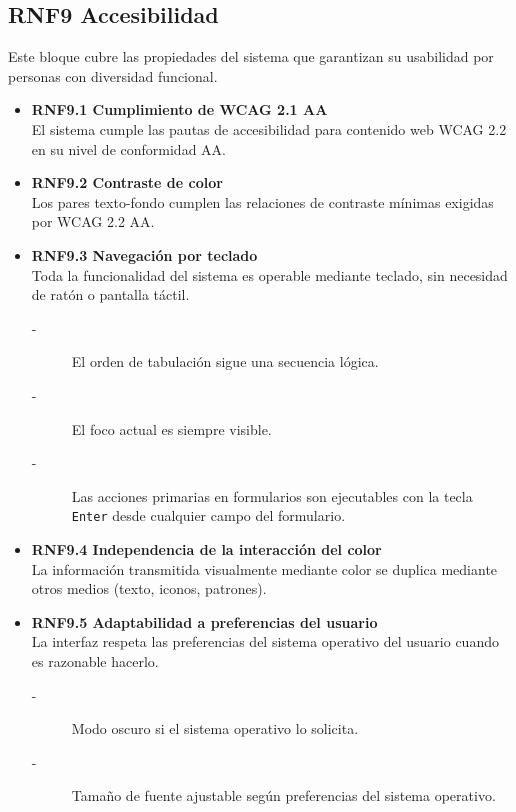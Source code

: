 \subsection{RNF9 Accesibilidad}
Este bloque cubre las propiedades del sistema que garantizan su
usabilidad por personas con diversidad funcional.
\begin{itemize}
    \item \textbf{RNF9.1 Cumplimiento de WCAG 2.1 AA} \\
    El sistema cumple las pautas de accesibilidad para contenido web
    WCAG 2.2 en su nivel de conformidad AA.\@


    \item \textbf{RNF9.2 Contraste de color} \\
    Los pares texto-fondo cumplen las relaciones de contraste mínimas
    exigidas por WCAG 2.2 AA.\@


    \item \textbf{RNF9.3 Navegación por teclado} \\
    Toda la funcionalidad del sistema es operable mediante teclado, sin
    necesidad de ratón o pantalla táctil.
    \begin{description}
        \item[-] El orden de tabulación sigue una secuencia lógica.
        \item[-] El foco actual es siempre visible.
        \item[-] Las acciones primarias en formularios son ejecutables con la tecla
        \texttt{Enter} desde cualquier campo del formulario.
    \end{description}


    \item \textbf{RNF9.4 Independencia de la interacción del color} \\
    La información transmitida visualmente mediante color se duplica
    mediante otros medios (texto, iconos, patrones).


    \item \textbf{RNF9.5 Adaptabilidad a preferencias del usuario} \\
    La interfaz respeta las preferencias del sistema operativo del
    usuario cuando es razonable hacerlo.
    \begin{description}
        \item[-] Modo oscuro si el sistema operativo lo solicita. 
        \item[-] Tamaño de fuente ajustable según preferencias del sistema operativo.
    \end{description}
\end{itemize}


